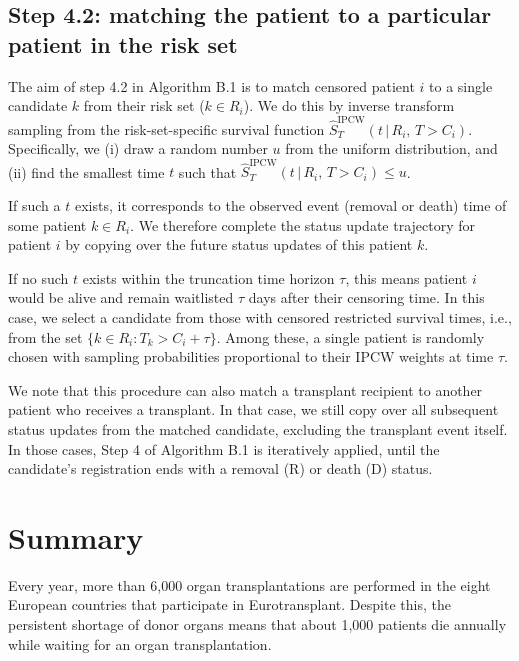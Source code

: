 \documentclass[11pt,twoside,]{book}
\begin{document}
\FloatBarrier

\section{Step 4.2: matching the patient to a particular patient in the risk set}\label{step-4.2-matching-the-patient-to-a-particular-patient-in-the-risk-set}

The aim of step 4.2 in Algorithm B.1 is to match censored patient \(i\) to a single candidate \(k\) from their risk set (\(k\in
R_i\)). We do this by inverse transform sampling from the
risk-set-specific survival function
\(\hat{S}^{\text{IPCW}}_T(t\,|\,R_i,\, T > C_i)\). Specifically, we
(i) draw a random number \(u\) from the uniform distribution, and
(ii) find the smallest time \(t\) such that \(\hat{S}^{\text{IPCW}}_T(t\,|\,R_i,\, T > C_i) \leq u\).

If such a \(t\) exists, it corresponds to the observed event
(removal or death) time of some patient \(k \in R_i\). We therefore
complete the status update trajectory for patient \(i\) by copying
over the future status updates of this patient \(k\).

If no such \(t\) exists within the truncation time horizon \(\tau\),
this means patient \(i\) would be alive and remain waitlisted
\(\tau\) days after their censoring time. In this case, we select a
candidate from those with censored restricted survival times,
i.e., from the set \(\{k \in R_i : T_k > C_i + \tau\}\). Among
these, a single patient is randomly chosen with sampling
probabilities proportional to their IPCW weights at time \(\tau\).

We note that this procedure can also match a transplant recipient to
another patient who receives a transplant. In that case, we still
copy over all subsequent status updates from the matched candidate,
excluding the transplant event itself. In those cases, Step 4
of Algorithm B.1 is iteratively applied, until the candidate's
registration ends with a removal (R) or death (D) status.

\chapter*{Summary}\label{summary}


Every year, more than 6,000 organ transplantations are performed in the eight
European countries that participate in Eurotransplant. Despite this, the persistent
shortage of donor organs means that about 1,000 patients die annually while waiting for
an organ transplantation.
\end{document}
